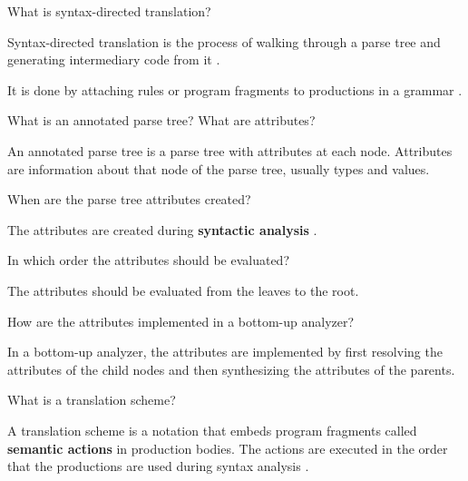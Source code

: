 \begin{Exercise}
What is syntax-directed translation?
\end{Exercise}
\begin{Answer}
Syntax-directed translation is the process of walking through a parse tree and generating intermediary code from it \cite[p.~12]{compilers-aho-2007}.

It is done by attaching rules or program fragments to productions in a grammar \cite[p.~52]{compilers-aho-2007}.
\end{Answer}

\begin{Exercise}
What is an annotated parse tree? What are attributes?
\end{Exercise}
\begin{Answer}
An annotated parse tree is a parse tree with attributes at each node.
Attributes are information about that node of the parse tree, usually types and values.
\end{Answer}

\begin{Exercise}
When are the parse tree attributes created?
\end{Exercise}
\begin{Answer}
The attributes are created during \textbf{syntactic analysis} \cite[p.~54]{compilers-aho-2007}.
\end{Answer}

\begin{Exercise}
In which order the attributes should be evaluated?
\end{Exercise}
\begin{Answer}
The attributes should be evaluated from the leaves to the root.
\end{Answer}

\begin{Exercise}
How are the attributes implemented in a bottom-up analyzer?
\end{Exercise}
\begin{Answer}
In a bottom-up analyzer, the attributes are implemented by first resolving the attributes of the child nodes and then synthesizing the attributes of the parents.
\end{Answer}

\begin{Exercise}
What is a translation scheme?
\end{Exercise}
\begin{Answer}
A translation scheme is a notation that embeds program fragments called
\textbf{semantic actions} in production bodies.
The actions are executed in the order that the productions are used during syntax analysis \cite[p.~107]{compilers-aho-2007}.
\end{Answer}

